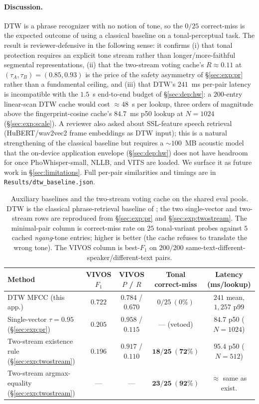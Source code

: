 \documentclass[a4paper,fleqn]{cas-dc}
\begin{document}
\paragraph{Discussion.} DTW is a phrase recognizer with no notion of tone, so the $0/25$ correct-miss is the expected outcome of using a classical baseline on a tonal-perceptual task. The result is reviewer-defensive in the following sense: it confirms (i) that tonal protection requires an explicit tone stream rather than longer/more-faithful segmental representations, (ii) that the two-stream voting cache's $R \approx 0.11$ at $(\tau_A, \tau_B) = (0.85, 0.93)$ is the price of the safety asymmetry of \S\ref{sec:exp:pr} rather than a fundamental ceiling, and (iii) that DTW's $241$~ms per-pair latency is incompatible with the $1.5$~s end-to-end budget of \S\ref{sec:dep:hw}: a $200$-entry linear-scan DTW cache would cost $\approx 48$~s per lookup, three orders of magnitude above the fingerprint-cosine cache's $84.7$~ms p50 lookup at $N=1024$ (\S\ref{sec:exp:scale}). A reviewer also asked about SSL-feature speech retrieval (HuBERT/wav2vec2 frame embeddings as DTW input); this is a natural strengthening of the classical baseline but requires a $\sim 100$~MB acoustic model that the on-device application envelope (\S\ref{sec:dep:hw}) does not have headroom for once PhoWhisper-small, NLLB, and VITS are loaded. We surface it as future work in \S\ref{sec:limitations}. Full per-pair similarities and timings are in \texttt{Results/dtw\_baseline.json}.

\begin{table}[h]
\caption{Auxiliary baselines and the two-stream voting cache on the shared eval pools. DTW is the classical phrase-retrieval baseline of \citet{sakoe1978dtw}; the two single-vector and two-stream rows are reproduced from \S\ref{sec:exp:pr} and \S\ref{sec:exp:twostream}. The minimal-pair column is correct-miss rate on $25$ tonal-variant probes against $5$ cached \emph{ngang}-tone entries; higher is better (the cache refuses to translate the wrong tone). The VIVOS column is best-$F_1$ on $200/200$ same-text-different-speaker/different-text pairs.}\label{tab:auxbaselines}
\centering\footnotesize
\setlength{\tabcolsep}{4.5pt}
\begin{tabular}{lcccc}
\toprule
Method & VIVOS $F_1$ & VIVOS $P$ / $R$ & Tonal correct-miss & Latency (ms/lookup) \\
\midrule
DTW MFCC (this app.)                                        & $0.722$ & $0.784$ / $0.670$ & $0/25\ (0\%)$    & $241$ mean, $1{,}257$ p99 \\
Single-vector $\tau=0.95$ (\S\ref{sec:exp:pr})              & $0.205$ & $0.958$ / $0.115$ & --- (vetoed)     & $84.7$ p50 ($N=1024$) \\
Two-stream existence rule (\S\ref{sec:exp:twostream})       & $0.196$ & $0.917$ / $0.110$ & $\mathbf{18/25\ (72\%)}$ & $95.4$ p50 ($N=512$) \\
Two-stream argmax-equality (\S\ref{sec:exp:twostream})      & ---      & ---              & $\mathbf{23/25\ (92\%)}$ & $\approx$ same as exist. \\
\bottomrule
\end{tabular}
\end{table}
\end{document}
